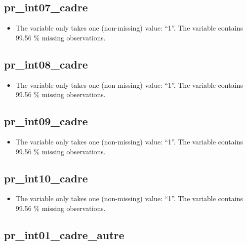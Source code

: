 \documentclass[
  letterpaper,
  DIV=11,
  numbers=noendperiod]{scrartcl}
\providecommand{\tightlist}{%
  \setlength{\itemsep}{0pt}\setlength{\parskip}{0pt}}
\begin{document}
\emini

\fullline

\subsection{pr\_int07\_cadre}\label{pr_int07_cadre}

\begin{itemize}
\tightlist
\item
  The variable only takes one (non-missing) value: ``1''. The variable
  contains 99.56 \% missing observations.
\end{itemize}

\fullline

\subsection{pr\_int08\_cadre}\label{pr_int08_cadre}

\begin{itemize}
\tightlist
\item
  The variable only takes one (non-missing) value: ``1''. The variable
  contains 99.56 \% missing observations.
\end{itemize}

\fullline

\subsection{pr\_int09\_cadre}\label{pr_int09_cadre}

\begin{itemize}
\tightlist
\item
  The variable only takes one (non-missing) value: ``1''. The variable
  contains 99.56 \% missing observations.
\end{itemize}

\fullline

\subsection{pr\_int10\_cadre}\label{pr_int10_cadre}

\begin{itemize}
\tightlist
\item
  The variable only takes one (non-missing) value: ``1''. The variable
  contains 99.56 \% missing observations.
\end{itemize}

\fullline

\subsection{pr\_int01\_cadre\_autre}\label{pr_int01_cadre_autre}
\end{document}
